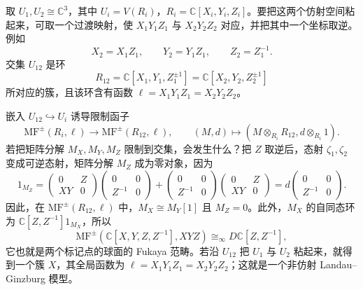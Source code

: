 \begin{example}[粘合裤子曲面得到四标记球面的镜像]\label{ex:gluing-pants-landau-ginzburg}
取 $U_1,U_2\cong\mathbb C^3$，其中 $U_i=V(R_i)$，$R_i=\mathbb C[X_i,Y_i,Z_i]$。要把这两个仿射空间粘起来，可取一个过渡映射，使 $X_1Y_1Z_1$ 与 $X_2Y_2Z_2$ 对应，并把其中一个坐标取逆。例如
\[
  X_2=X_1Z_1,\qquad Y_2=Y_1Z_1,\qquad Z_2=Z_1^{-1}.
\]
交集 $U_{12}$ 是环
\[
  R_{12}=\mathbb C[X_1,Y_1,Z_1^{\pm1}]
  =\mathbb C[X_2,Y_2,Z_2^{\pm1}]
\]
所对应的簇，且该环含有函数 $\ell=X_1Y_1Z_1=X_2Y_2Z_2$。

嵌入 $U_{12}\hookrightarrow U_i$ 诱导限制函子
\[
  \mathrm{MF}^{\pm}(R_i,\ell)\longrightarrow\mathrm{MF}^{\pm}(R_{12},\ell),
  \qquad (M,d)\longmapsto(M\otimes_{R_i}R_{12},d\otimes_{R_i}1).
\]
若把矩阵分解 $M_X,M_Y,M_Z$ 限制到交集，会发生什么？把 $Z$ 取逆后，态射 $\zeta_1,\zeta_2$ 变成可逆态射，矩阵分解 $M_Z$ 成为零对象，因为
\[
  1_{M_Z}=
  \begin{pmatrix}0&Z\\XY&0\end{pmatrix}
  \begin{pmatrix}0&0\\Z^{-1}&0\end{pmatrix}
  +\begin{pmatrix}0&0\\Z^{-1}&0\end{pmatrix}
  \begin{pmatrix}0&Z\\XY&0\end{pmatrix}
  =d\begin{pmatrix}0&0\\Z^{-1}&0\end{pmatrix}.
\]
因此，在 $\mathrm{MF}^{\pm}(R_{12},\ell)$ 中，$M_X\cong M_Y[1]$ 且 $M_Z=0$。此外，$M_X$ 的自同态环为 $\mathbb C[Z,Z^{-1}]1_{M_X}$，所以
\[
  \mathrm{MF}^{\pm}(\mathbb C[X,Y,Z,Z^{-1}],XYZ)
  \cong_\infty D\mathbb C[Z,Z^{-1}],
\]
它也就是两个标记点的球面的 Fukaya 范畴。若沿 $U_{12}$ 把 $U_1$ 与 $U_2$ 粘起来，就得到一个簇 $X$，其全局函数为 $\ell=X_1Y_1Z_1=X_2Y_2Z_2$；这就是一个非仿射 Landau--Ginzburg 模型。


\end{example}
